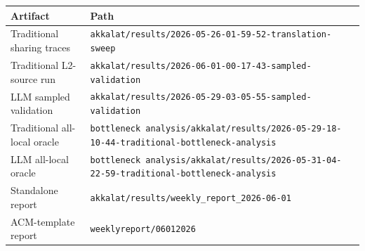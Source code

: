 \begin{tabular}{ll}
\toprule
Artifact & Path \\
\midrule
Traditional sharing traces & \texttt{akkalat/results/2026-05-26-01-59-52-translation-sweep} \\
Traditional L2-source run & \texttt{akkalat/results/2026-06-01-00-17-43-sampled-validation} \\
LLM sampled validation & \texttt{akkalat/results/2026-05-29-03-05-55-sampled-validation} \\
Traditional all-local oracle & \texttt{bottleneck analysis/akkalat/results/2026-05-29-18-10-44-traditional-bottleneck-analysis} \\
LLM all-local oracle & \texttt{bottleneck analysis/akkalat/results/2026-05-31-04-22-59-traditional-bottleneck-analysis} \\
Standalone report & \texttt{akkalat/results/weekly\_report\_2026-06-01} \\
ACM-template report & \texttt{weeklyreport/06012026} \\
\bottomrule
\end{tabular}
